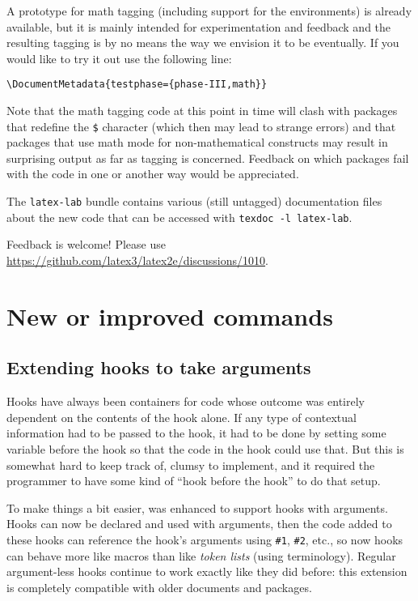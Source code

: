 \documentclass{ltnews}
\begin{document}
A prototype for math tagging (including support for the 
environments) is already available, but it is mainly intended for
experimentation and feedback and the resulting tagging is by no means
the way we envision it to be eventually. If you would like to try it out use
the following line:
\begin{verbatim}
\DocumentMetadata{testphase={phase-III,math}}
\end{verbatim}
Note that the math tagging code at this point in time will clash with
packages that redefine the \texttt{\$} character (which then may lead to strange
errors) and that packages that use math mode for non-mathematical
constructs may result in surprising output as far as tagging is
concerned. Feedback on which packages fail with the code in one or
another way would be appreciated.

The \texttt{latex-lab} bundle contains various 
(still untagged) documentation files about the new code that can
be accessed with \verb|texdoc -l latex-lab|.

Feedback is welcome! 
Please use \url{https://github.com/latex3/latex2e/discussions/1010}.



\section{New or improved commands}

\subsection{Extending hooks to take arguments}

Hooks have always been containers for code whose outcome was entirely
dependent on the contents of the hook alone.  If any type of contextual
information had to be passed to the hook, it had to be done by setting
some variable before the hook so that the code in the hook could use
that.  But this is somewhat hard to keep track of, clumsy to implement,
and it required the programmer to have some kind of \enquote{hook before
the hook} to do that setup.

To make things a bit easier,  was enhanced to support hooks
with arguments.  Hooks can now be declared and used with arguments, then
the code added to these hooks can reference the hook's arguments using
\verb|#1|, \verb|#2|, etc., so now hooks can behave more like macros
than like \emph{token lists} (using  terminology).  Regular
argument-less hooks continue to work exactly like they did before:  this
extension is completely compatible with older documents and packages.
\end{document}
